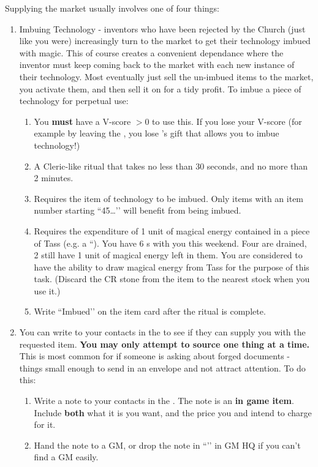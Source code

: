 \documentclass[green]{GL2020}
\begin{document}
Supplying the market usually involves one of four things:
\begin{enumerate}
  \item Imbuing Technology - inventors who have been rejected by the Church (just like you were) increasingly turn to the market to get their technology imbued with magic. This of course creates a convenient dependance where the inventor must keep coming back to the market with each new instance of their technology. Most eventually just sell the un-imbued items to the market, you activate them, and then sell it on for a tidy profit. To imbue a piece of technology for perpetual use:
  \begin{enumerate}
    \item You \textbf{must} have a V-score $>$0 to use this. If you lose your V-score (for example by leaving the \pGoaties{}, you lose \cGenesis{}’s gift that allows you to imbue technology!)
    \item A Cleric-like ritual that takes no less than 30 seconds, and no more than 2 minutes.
    \item Requires the item of technology to be imbued. Only items with an item number starting ``45…’’ will benefit from being imbued.
    \item Requires the expenditure of 1 unit of magical energy contained in a piece of Tass (e.g. a ``\iChargingStone{}). You have 6 \iChargingStone{\MYname}s with you this weekend. Four are drained, 2 still have 1 unit of magical energy left in them.  You are considered to have the ability to draw magical energy from Tass for the purpose of this task. (Discard the CR stone from the item to the nearest stock when you use it.)
    \item Write ``Imbued’’ on the item card after the ritual is complete.
  \end{enumerate}
  \item You can write to your contacts in the \pTech{} to see if they can supply you with the requested item. \textbf{You may only attempt to source one thing at a time.} This is most common for if someone is asking about forged documents - things small enough to send in an envelope and not attract attention. To do this:
  \begin{enumerate}
    \item Write a note to your contacts in the \pTech{}. The note is an \textbf{in game item}. Include \textbf{both} what it is you want, and the price you and \cChupSecond{} intend to charge for it.
    \item Hand the note to a GM, or drop the note in ``\sSignR{}’’ in GM HQ if you can’t find a GM easily.

\end{enumerate}
\end{enumerate}
\end{document}
